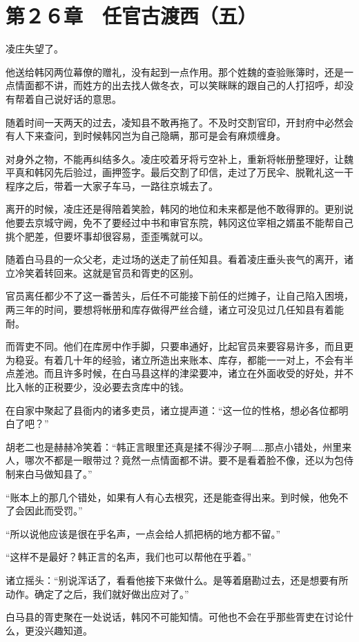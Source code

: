 \section{第２６章　任官古渡西（五）}

凌庄失望了。

他送给韩冈两位幕僚的赠礼，没有起到一点作用。那个姓魏的查验账簿时，还是一点情面都不讲，而姓方的出去找人做冬衣，可以笑眯眯的跟自己的人打招呼，却没有帮着自己说好话的意思。

随着时间一天两天的过去，凌知县不敢再拖了。不及时交割官印，开封府中必然会有人下来查问，到时候韩冈岂为自己隐瞒，那可是会有麻烦缠身。

对身外之物，不能再纠结多久。凌庄咬着牙将亏空补上，重新将帐册整理好，让魏平真和韩冈先后验过，画押签字。最后交割了印信，走过了万民伞、脱靴礼这一干程序之后，带着一大家子车马，一路往京城去了。

离开的时候，凌庄还是得陪着笑脸，韩冈的地位和未来都是他不敢得罪的。更别说他要去京城守阙，免不了要经过中书和审官东院，韩冈这位宰相之婿虽不能帮自己挑个肥差，但要坏事却很容易，歪歪嘴就可以。

随着白马县的一众父老，走过场的送走了前任知县。看着凌庄垂头丧气的离开，诸立冷笑着转回来。这就是官员和胥吏的区别。

官员离任都少不了这一番苦头，后任不可能接下前任的烂摊子，让自己陷入困境，两三年的时间，要想将帐册和库存做得严丝合缝，诸立可没见过几任知县有着能耐。

而胥吏不同。他们在库房中作手脚，只要串通好，比起官员来要容易许多，而且更为稳妥。有着几十年的经验，诸立所造出来账本、库存，都能一一对上，不会有半点差池。而且许多时候，在白马县这样的津梁要冲，诸立在外面收受的好处，并不比入帐的正税要少，没必要去贪库中的钱。

在自家中聚起了县衙内的诸多吏员，诸立提声道：“这一位的性格，想必各位都明白了吧？”

胡老二也是赫赫冷笑着：“韩正言眼里还真是揉不得沙子啊……那点小错处，州里来人，哪次不都是一眼带过？竟然一点情面都不讲。要不是看着脸不像，还以为包侍制来白马做知县了。”

“账本上的那几个错处，如果有人有心去根究，还是能查得出来。到时候，他免不了会因此而受罚。”

“所以说他应该是很在乎名声，一点会给人抓把柄的地方都不留。”

“这样不是最好？韩正言的名声，我们也可以帮他在乎着。”

诸立摇头：“别说浑话了，看看他接下来做什么。是等着磨勘过去，还是想要有所动作。确定了之后，我们就好做出应对了。”

白马县的胥吏聚在一处说话，韩冈不可能知情。可他也不会在乎那些胥吏在讨论什么，更没兴趣知道。

